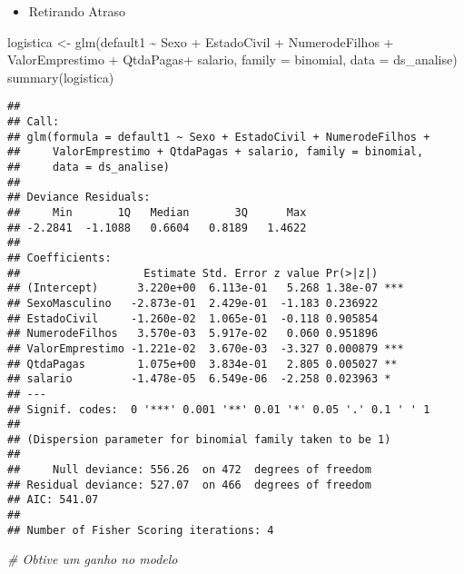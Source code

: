 \documentclass[
]{article}
\newenvironment{Shaded}{\begin{snugshade}}{\end{snugshade}}
\newcommand{\AttributeTok}[1]{\textcolor[rgb]{0.77,0.63,0.00}{#1}}
\newcommand{\CommentTok}[1]{\textcolor[rgb]{0.56,0.35,0.01}{\textit{#1}}}
\newcommand{\FunctionTok}[1]{\textcolor[rgb]{0.00,0.00,0.00}{#1}}
\newcommand{\NormalTok}[1]{#1}
\newcommand{\OtherTok}[1]{\textcolor[rgb]{0.56,0.35,0.01}{#1}}
\newcommand{\SpecialCharTok}[1]{\textcolor[rgb]{0.00,0.00,0.00}{#1}}
\providecommand{\tightlist}{%
  \setlength{\itemsep}{0pt}\setlength{\parskip}{0pt}}
\begin{document}
\begin{itemize}
\tightlist
\item
  Retirando Atraso
\end{itemize}

\begin{Shaded}
\begin{Highlighting}[]
\NormalTok{logistica }\OtherTok{\textless{}{-}} \FunctionTok{glm}\NormalTok{(default1 }\SpecialCharTok{\textasciitilde{}}\NormalTok{ Sexo }\SpecialCharTok{+} 
\NormalTok{                            EstadoCivil }\SpecialCharTok{+} 
\NormalTok{                            NumerodeFilhos }\SpecialCharTok{+} 
\NormalTok{                            ValorEmprestimo }\SpecialCharTok{+}
\NormalTok{                            QtdaPagas}\SpecialCharTok{+} 
\NormalTok{                            salario, }\AttributeTok{family =}\NormalTok{ binomial, }\AttributeTok{data =}\NormalTok{ ds\_analise)}
\FunctionTok{summary}\NormalTok{(logistica)}
\end{Highlighting}
\end{Shaded}

\begin{verbatim}
## 
## Call:
## glm(formula = default1 ~ Sexo + EstadoCivil + NumerodeFilhos + 
##     ValorEmprestimo + QtdaPagas + salario, family = binomial, 
##     data = ds_analise)
## 
## Deviance Residuals: 
##     Min       1Q   Median       3Q      Max  
## -2.2841  -1.1088   0.6604   0.8189   1.4622  
## 
## Coefficients:
##                   Estimate Std. Error z value Pr(>|z|)    
## (Intercept)      3.220e+00  6.113e-01   5.268 1.38e-07 ***
## SexoMasculino   -2.873e-01  2.429e-01  -1.183 0.236922    
## EstadoCivil     -1.260e-02  1.065e-01  -0.118 0.905854    
## NumerodeFilhos   3.570e-03  5.917e-02   0.060 0.951896    
## ValorEmprestimo -1.221e-02  3.670e-03  -3.327 0.000879 ***
## QtdaPagas        1.075e+00  3.834e-01   2.805 0.005027 ** 
## salario         -1.478e-05  6.549e-06  -2.258 0.023963 *  
## ---
## Signif. codes:  0 '***' 0.001 '**' 0.01 '*' 0.05 '.' 0.1 ' ' 1
## 
## (Dispersion parameter for binomial family taken to be 1)
## 
##     Null deviance: 556.26  on 472  degrees of freedom
## Residual deviance: 527.07  on 466  degrees of freedom
## AIC: 541.07
## 
## Number of Fisher Scoring iterations: 4
\end{verbatim}

\begin{Shaded}
\begin{Highlighting}[]
\CommentTok{\# Obtive um ganho no modelo}
\end{Highlighting}
\end{Shaded}
\end{document}
